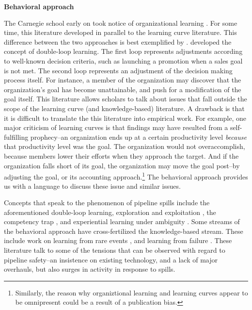 

\textbf{Behavioral approach}

The Carnegie school early on took notice of organizational learning \citep[e.g., ][]{March1963}. For some time, this literature developed in parallel to the learning curve literature. This difference between the two approaches is best exemplified by \citet{Argyris1978}. \citet{Argyris1978} developed the concept of double-loop learning. The first loop represents adjustments according to well-known decision criteria, such as launching a promotion when a sales goal is not met. The second loop represents an adjustment of the decision making process itself. For instance, a member of the organization may discover that the organization's goal has become unattainable, and push for a modification of the goal itself. This literature allows scholars to talk about issues that fall outside the scope of the learning curve (and knowledge-based) literature. A drawback is that it is difficult to translate the this literature into empirical work. For example, one major criticism of learning curves is that findings may have resulted from a self-fulfilling prophecy--an organization ends up at a certain productivity level \textit{because} that productivity level was the goal. The organization would not overaccomplish, because members lower their efforts when they approach the target. And if the organization falls short of its goal, the organization may move the goal post--by adjusting the goal, or its accounting approach.\footnote{Similarly, the reason why organiztional learning and learning curves appear to be omnipresent could be a result of a publication bias.} The behavioral approach provides us with a language to discuss these issue and similar issues. 

Concepts that speak to the phenomenon of pipeline spills include the aforementioned double-loop learning, exploration and exploitation \citep{March1991}, the competency trap \citep{Levitt1988}, and experiential learning under ambiguity \citep{March1975}. Some streams of the behavioral approach have cross-fertilized the knowledge-based stream. These include work on learning from rare events \citep{March1991b, Maslach2018}, and learning from failure \citep[e.g.,][]{Madsen2010}. These literature talk to some of the tensions that can be observed with regard to pipeline safety--an insistence on existing technology, and a lack of major overhauls, but also surges in activity in response to spills.

